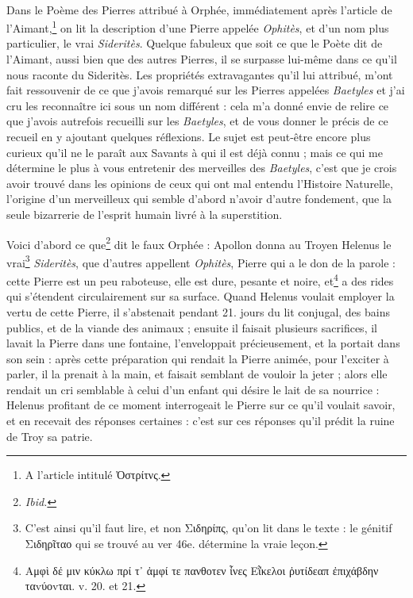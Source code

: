 \documentclass[a4paper, 11pt, oneside, polutonikogreek, french]{article}
\begin{document}
\paragraph{}
Dans le Poème des Pierres attribué à Orphée, immédiatement après l'article de l'Aimant,\footnote{A l'article intitulé Ὀστρίτνς.} on lit la description d'une Pierre appelée \emph{Ophitès}, et d'un nom plus particulier, le vrai \emph{Sideritès}. Quelque fabuleux que soit ce que le Poète dit de l'Aimant, aussi bien que des autres Pierres, il se surpasse lui-même dans ce qu'il nous raconte du Sideritès. Les propriétés extravagantes qu'il lui attribué, m'ont fait ressouvenir de ce que j'avois remarqué sur les Pierres appelées \emph{Baetyles} et j'ai cru les reconnaître ici sous un nom différent : cela m'a donné envie de relire ce que j'avois autrefois recueilli sur les \emph{Baetyles}, et de vous donner le précis de ce recueil en y ajoutant quelques réflexions. Le sujet est peut-être encore plus curieux qu'il ne le paraît aux Savants à qui il est déjà connu ; mais ce qui me détermine le plus à vous entretenir des merveilles des \emph{Baetyles}, c'est que je crois avoir trouvé dans les opinions de ceux qui ont mal entendu l'Histoire Naturelle, l'origine d'un merveilleux qui semble d'abord n'avoir d'autre fondement, que la seule bizarrerie de l'esprit humain livré à la superstition.

Voici d'abord ce que\footnote{\emph{Ibid.}} dit le faux Orphée : Apollon donna au Troyen Helenus le vrai\footnote{C'est ainsi qu'il faut lire, et non Σιδηρίπς, qu'on lit dans le texte : le génitif Σιδηρῖταο qui se trouvé au ver 46e. détermine la vraie leçon.} \emph{Sideritès}, que d'autres appellent \emph{Ophitès}, Pierre qui a le don de la parole : cette Pierre est un peu raboteuse, elle est dure, pesante et noire, et\footnote{Αμφὶ δέ μιν κύκλω πρί τ᾽ ἀμφί τε πανθοτεν ἶνες Εῗκελοι ῥυτίδεαπ ἐπιχάβδην ταvύοvται. v. 20. et 21.} a des rides qui s'étendent circulairement sur sa surface. Quand Helenus voulait employer la vertu de cette Pierre, il s'abstenait pendant 21. jours du lit conjugal, des bains publics, et de la viande des animaux ; ensuite il faisait plusieurs sacrifices, il lavait la Pierre dans une fontaine, l'enveloppait précieusement, et la portait dans son sein : après cette préparation qui rendait la Pierre animée, pour l'exciter à parler, il la prenait à la main, et faisait semblant de vouloir la jeter ; alors elle rendait un cri semblable à celui d'un enfant qui désire le lait de sa nourrice : Helenus profitant de ce moment interrogeait le Pierre sur ce qu'il voulait savoir, et en recevait des réponses certaines : c'est sur ces réponses qu'il prédit la ruine de Troy sa patrie.
\end{document}
